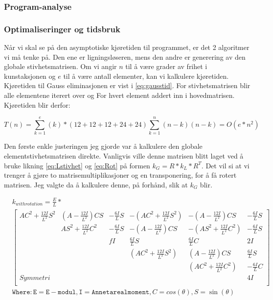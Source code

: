 \documentclass[10pt,a4paper, norsk]{article}
\begin{document}
\subsubsection{Program-analyse}

\subsubsection{Optimaliseringer og tidsbruk}
Når vi skal se på den asymptotiske kjøretiden til programmet, er det 2 algoritmer vi må tenke på. Den ene er ligningsløseren, mens den andre er generering av den globale stivhetsmatrisen. Om vi angir $n$ til å være grader av frihet i kunstaksjonen og $e$ til å være antall elementer, kan vi kalkulere kjøretiden. Kjøretiden til Gauss eliminasjonen er vist i \eqref{eq:gausstid}. For stivhetsmatrisen blir alle elementene iterert over og For hvert element addert inn i hovedmatrisen. Kjøretiden blir derfor:

\begin{equation} \label{eq:en3}
T(n) = \sum_{k=1}^{e} (k)*(12+12+12+24+24) \sum_{k=1}^{n} (n-k)(n-k) = O(e*n^2)
\end{equation}  


Den første enkle justeringen jeg gjorde var å kalkulere den globale elementstivhetsmatrisen direkte. Vanligvis ville denne matrisen blitt laget ved å bruke likning \ref{eq:Lstivhet} og \ref{eq:Rot} på formen $k_G=R*k_L*R^T$. Det vil si at vi trenger å gjøre to matrisemultiplikasjoner og en transponering, for å få rotert matrisen. Jeg valgte da å kalkulere denne, på forhånd, slik at $k_G$ blir. 

\begin{equation} 
\begin{aligned}
& k_{with rotation} = \frac{E}{L} * \\ 
&\begin{bmatrix}
AC^2+\frac{12I}{L^2} S^2  & (A-\frac{12I}{L^2})CS  &  -\frac{6I}{L}S & -(AC^2+\frac{12I}{L^2}S^2) & -(A-\frac{12I}{L^2})CS &  -\frac{6I}{L}S \\
 & AS^2 + \frac{12I}{L^2}C^2 & -\frac{6I}{L}S & -(A-\frac{12I}{L^2})CS & -(AS^2+\frac{12I}{L^2}C^2) &  -\frac{6I}{L}S \\
 & & fI &  \frac{6I}{L}S & \frac{6I}{L}C & 2I \\
 & & & (AC^2+\frac{12I}{L^2}S^2) & (A-\frac{12I}{L^2})CS & \frac{6I}{L}S\\
 & & & & (AC^2+\frac{12I}{L^2}C^2) & -\frac{6I}{L}C \\
 Symmetri & & & & & 4I \\
\end{bmatrix} \\
& \mathtt{ Where: E=E-modul, I=Annet arealmoment, } C=cos(\theta), S=\sin(\theta) \\
\end{aligned}
\end{equation}
\end{document}
